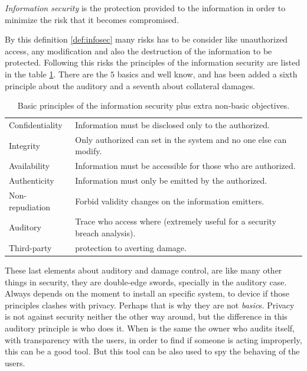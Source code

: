 \documentclass[10pt,a4paper,twoside]{llncs}
\begin{document}
\begin{definition}\label{def:infosec}
    \emph{Information security} is the protection provided to the information in order to minimize the risk that it becomes compromised.
\end{definition}

By this definition \ref{def:infosec} many risks has to be consider like unauthorized access, any modification and also the destruction of the information to be protected. Following this risks the principles of the information security are listed in the table \ref{tab:infosec}. There are the $5$ basics and well know, and has been added a sixth principle about the auditory and a seventh about collateral damages.

\begin{table}[h]
    \begin{center}
        \begin{tabular}{|l|l|}
            \hline
            Confidentiality & Information must be disclosed only to the authorized. \\
            Integrity & Only authorized can set in the system and no one else can modify. \\
            Availability & Information must be accessible for those who are authorized. \\
            Authenticity & Information must only be emitted by the authorized. \\
            Non-repudiation & Forbid validity changes on the information emitters. \\
            \hline
            Auditory & Trace who access where (extremely useful for a security breach analysis). \\
            Third-party & protection to averting damage. \\
            \hline
        \end{tabular}
        \caption{Basic principles of the information security plus extra non-basic objectives.}\label{tab:infosec}
    \end{center}
\end{table}

These last elements about auditory and damage control, are like many other things in security, they are double-edge swords, specially in the auditory case. Always depends on the moment to install an specific system, to device if those principles clashes with privacy. Perhaps that is why they are not \emph{basic}s. Privacy is not against security neither the other way around, but the difference in this auditory principle is who does it. When is the same the owner who audits itself, with transparency with the users, in order to find if someone is acting improperly, this can be a good tool. But this tool can be also used to spy the behaving of the users.
\end{document}
